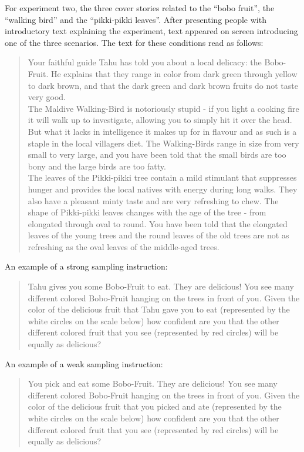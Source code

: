 \documentclass[doc]{apa6}
\begin{document}
For experiment two, the three cover stories related to the ``bobo fruit'', the ``walking bird'' and the ``pikki-pikki leaves''. After presenting people with introductory text explaining the experiment, text appeared on screen introducing one of the three scenarios. The text for these conditions read as follows:
 \begin{quotation} \footnotesize \linespread{.5} \noindent\textsf{Your faithful guide Tahu has told you about a local delicacy: the Bobo-Fruit. He explains that they range in color from dark green through yellow to dark brown, and that the dark green and dark brown fruits do not taste very good.
\vspace*{9pt} \\
\noindent The Maldive Walking-Bird is notoriously stupid - if you light a cooking fire it will walk up to investigate, allowing you to simply hit it over the head. But what it lacks in intelligence it makes up for in flavour and as such is a staple in the local villagers diet. The Walking-Birds range in size from very small to very large, and you have been told that the small birds are too bony and the large birds are too fatty.
\vspace*{9pt} \\
\noindent The leaves of the Pikki-pikki tree contain a mild stimulant that suppresses hunger and provides the local natives with energy during long walks. They also have a pleasant minty taste and are very refreshing to chew. The shape of Pikki-pikki leaves changes with the age of the tree - from elongated through oval to round. You have been told that the elongated leaves of the young trees and the round leaves of the old trees are not as refreshing as the oval leaves of the middle-aged trees.
}\normalsize \end{quotation}\vspace*{-4pt}
An example of a strong sampling instruction:
\vspace*{-3pt} \begin{quotation} \footnotesize \linespread{.5} \noindent\textsf{Tahu gives you some Bobo-Fruit to eat. They are delicious! You see many different colored Bobo-Fruit hanging on the trees in front of you. Given the color of the delicious fruit that Tahu gave you to eat (represented by the white circles on the scale below) how confident are you that the other different colored fruit that you see (represented by red circles) will be equally as delicious?
}\normalsize \end{quotation}\vspace*{-4pt}
An example of a weak sampling instruction:
\vspace*{-3pt} \begin{quotation} \footnotesize \linespread{.5} \noindent\textsf{You pick and eat some Bobo-Fruit. They are delicious! You see many different colored Bobo-Fruit hanging on the trees in front of you. Given the color of the delicious fruit that you picked and ate (represented by the white circles on the scale below) how confident are you that the other different colored fruit that you see (represented by red circles) will be equally as delicious?
}\normalsize \end{quotation}\vspace*{-4pt}
\end{document}
